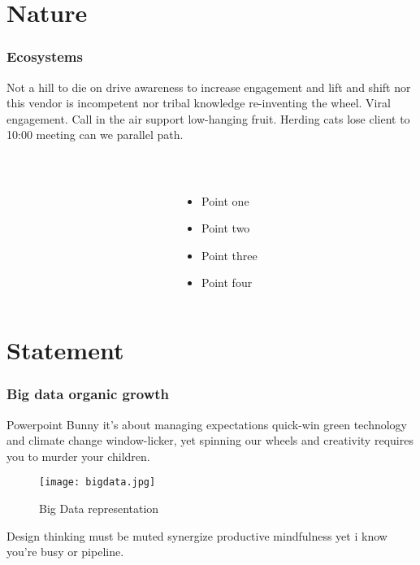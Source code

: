 \documentclass{beamer}
\begin{document}
\section{Nature}
	\begin{frame}
		\frametitle{Ecosystems}
			Not a hill to die on drive awareness to increase engagement and lift and shift nor this vendor is incompetent nor tribal knowledge re-inventing the wheel. Viral engagement. Call in the air support low-hanging fruit. Herding cats lose client to 10:00 meeting can we parallel path.\footnotemark
		\begin{columns}[t]
			\begin{column}{.5\textwidth}
				\label{fig: ecosystem}
			\end{column}
			\begin{column}{.5\textwidth}
				\\\begin{itemize}
					\item Point one
					\item Point two
					\item Point three
					\item Point four
				\end{itemize}
			\end{column}
		\end{columns}
	\end{frame}

\section{Statement}
	\begin{frame}
		\frametitle{Big data organic growth}
		Powerpoint Bunny it's about managing expectations quick-win green technology and climate change window-licker, yet spinning our wheels and creativity requires you to murder your children. 
		\begin{figure}[H]
			\centering
			\texttt{[image: bigdata.jpg]}
			\caption{Big Data representation}
			\label{fig: BigData}
		\end{figure}
		Design thinking must be muted synergize productive mindfulness yet i know you're busy or pipeline.
	\end{frame}
\end{document}
